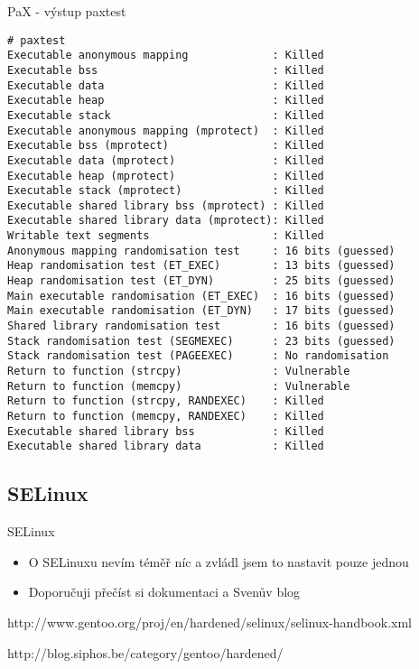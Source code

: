 \documentclass{beamer}
\begin{document}
\begin{frame}[fragile]{PaX - výstup paxtest}
	\begin{tiny}
	\begin{verbatim}
# paxtest
Executable anonymous mapping             : Killed
Executable bss                           : Killed
Executable data                          : Killed
Executable heap                          : Killed
Executable stack                         : Killed
Executable anonymous mapping (mprotect)  : Killed
Executable bss (mprotect)                : Killed
Executable data (mprotect)               : Killed
Executable heap (mprotect)               : Killed
Executable stack (mprotect)              : Killed
Executable shared library bss (mprotect) : Killed
Executable shared library data (mprotect): Killed
Writable text segments                   : Killed
Anonymous mapping randomisation test     : 16 bits (guessed)
Heap randomisation test (ET_EXEC)        : 13 bits (guessed)
Heap randomisation test (ET_DYN)         : 25 bits (guessed)
Main executable randomisation (ET_EXEC)  : 16 bits (guessed)
Main executable randomisation (ET_DYN)   : 17 bits (guessed)
Shared library randomisation test        : 16 bits (guessed)
Stack randomisation test (SEGMEXEC)      : 23 bits (guessed)
Stack randomisation test (PAGEEXEC)      : No randomisation
Return to function (strcpy)              : Vulnerable
Return to function (memcpy)              : Vulnerable
Return to function (strcpy, RANDEXEC)    : Killed
Return to function (memcpy, RANDEXEC)    : Killed
Executable shared library bss            : Killed
Executable shared library data           : Killed
	\end{verbatim}
	\end{tiny}
\end{frame}


\subsection{SELinux}

\begin{frame}{SELinux}
	\begin{itemize}
		\item O SELinuxu nevím téměř níc a zvládl jsem to nastavit pouze jednou
		\item Doporučuji přečíst si dokumentaci a Svenův blog
	\end{itemize}
	\begin{center}http://www.gentoo.org/proj/en/hardened/selinux/selinux-handbook.xml\end{center}
	\begin{center}http://blog.siphos.be/category/gentoo/hardened/\end{center}
\end{frame}
\end{document}
